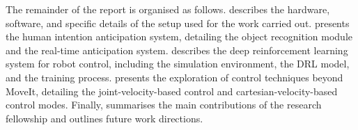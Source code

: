 The remainder of the report is organised as follows.  describes the hardware, software, and specific details of the setup used for the work carried out.  presents the human intention anticipation system, detailing the object recognition module and the real-time anticipation system.  describes the deep reinforcement learning system for robot control, including the simulation environment, the DRL model, and the training process.  presents the exploration of control techniques beyond MoveIt, detailing the joint-velocity-based control and cartesian-velocity-based control modes. Finally,  summarises the main contributions of the research fellowship and outlines future work directions.
